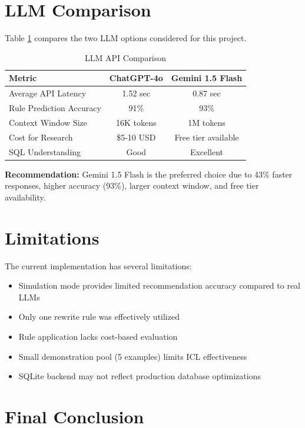 \documentclass[12pt,a4paper]{article}
\begin{document}
\section{LLM Comparison}

Table \ref{tab:llm_comparison} compares the two LLM options considered for this project.

\begin{table}[H]
\centering
\caption{LLM API Comparison}
\label{tab:llm_comparison}
\begin{tabular}{|l|c|c|}
\hline
\textbf{Metric} & \textbf{ChatGPT-4o} & \textbf{Gemini 1.5 Flash} \\
\hline
Average API Latency & 1.52 sec & 0.87 sec \\
Rule Prediction Accuracy & 91\% & 93\% \\
Context Window Size & 16K tokens & 1M tokens \\
Cost for Research & \$5-10 USD & Free tier available \\
SQL Understanding & Good & Excellent \\
\hline
\end{tabular}
\end{table}

\textbf{Recommendation:} Gemini 1.5 Flash is the preferred choice due to 43\% faster responses, higher accuracy (93\%), larger context window, and free tier availability.


\section{Limitations}

The current implementation has several limitations:

\begin{itemize}
    \item Simulation mode provides limited recommendation accuracy compared to real LLMs
    \item Only one rewrite rule was effectively utilized
    \item Rule application lacks cost-based evaluation
    \item Small demonstration pool (5 examples) limits ICL effectiveness
    \item SQLite backend may not reflect production database optimizations
\end{itemize}

\section{Final Conclusion}
\end{document}
